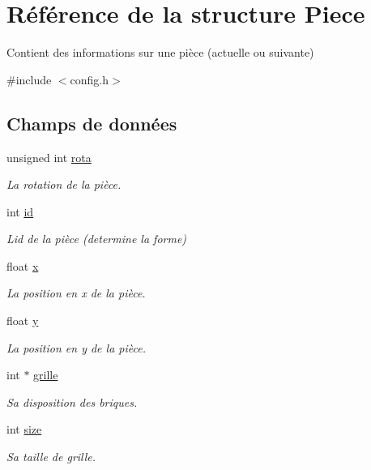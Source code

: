 \hypertarget{struct_piece}{}\section{Référence de la structure Piece}
\label{struct_piece}


Contient des informations sur une pièce (actuelle ou suivante)  




{\ttfamily \#include $<$config.\+h$>$}

\subsection*{Champs de données}
\begin{DoxyCompactItemize}
\item 
unsigned int \hyperlink{struct_piece_ad3c1a967d0ba8aad19e4ed9d9d3e21a4}{rota}
\begin{DoxyCompactList}\small\item\em La rotation de la pièce. \end{DoxyCompactList}\item 
int \hyperlink{struct_piece_ac40cffee50da10a50361ff4791fdd528}{id}
\begin{DoxyCompactList}\small\item\em L\textquotesingle{}id de la pièce (determine la forme) \end{DoxyCompactList}\item 
float \hyperlink{struct_piece_aa7f9008e1aa6bacebfd319bfb30c5bcc}{x}
\begin{DoxyCompactList}\small\item\em La position en x de la pièce. \end{DoxyCompactList}\item 
float \hyperlink{struct_piece_a0eea0ecdd99782e029bef01950f596ca}{y}
\begin{DoxyCompactList}\small\item\em La position en y de la pièce. \end{DoxyCompactList}\item 
int $\ast$ \hyperlink{struct_piece_a37ac5e8ab5ac3980e9685b660c79e1cd}{grille}
\begin{DoxyCompactList}\small\item\em Sa disposition des briques. \end{DoxyCompactList}\item 
int \hyperlink{struct_piece_ae6aaaa3c177258e1b49d431ba3a12c05}{size}
\begin{DoxyCompactList}\small\item\em Sa taille de grille. \end{DoxyCompactList}\item 

\end{DoxyCompactItemize}
